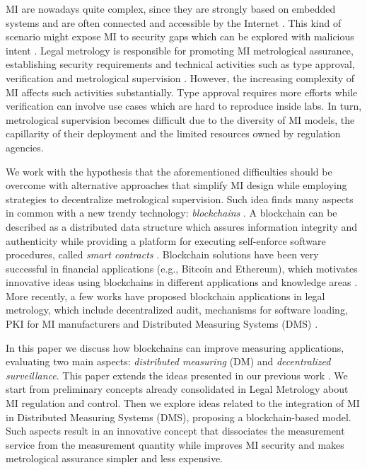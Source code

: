 \documentclass[journal]{IEEEtran}
\begin{document}
MI are nowadays quite complex, since they are strongly based on embedded systems and are often connected and accessible by the Internet \cite{Esche2015,Camara2012}. 
This kind of scenario might expose MI to security gaps which can be explored with malicious intent \cite{Boccardo2014,Peters2015}.
Legal metrology is responsible for promoting MI metrological assurance, establishing security requirements and technical activities such as type approval, verification and metrological supervision \cite{RodriguesFilho2015}. 
However, the increasing complexity of MI affects such activities substantially. 
Type approval requires more efforts while verification can involve use cases which are hard to reproduce inside labs. 
In turn, metrological supervision becomes difficult due to the diversity of MI models, the capillarity of their deployment and the limited resources owned by regulation agencies.

We work with the hypothesis that the aforementioned difficulties should be overcome with alternative approaches that simplify MI design while employing strategies to decentralize metrological supervision. 
Such idea finds many aspects in common with a new trendy technology: \emph{blockchains} \cite{Nakamoto2008}. 
A blockchain can be described as a distributed data structure which assures information integrity and authenticity while providing a platform for executing self-enforce software procedures, called \emph{smart contracts} \cite{Christidis2016}. Blockchain solutions have been very successful in financial applications (e.g., Bitcoin and Ethereum), which motivates innovative ideas using blockchains in different applications and knowledge areas \cite{Nakamoto2008,Christidis2016}.
More recently, a few works have proposed blockchain applications in legal metrology, which include decentralized audit, mechanisms for software loading, PKI for MI manufacturers and Distributed Measuring Systems (DMS) \cite{Peters2018,MeloJr.2018a}.

In this paper we discuss how blockchains can improve measuring applications, evaluating two main aspects: \emph{distributed measuring} (DM) and \emph{decentralized surveillance}.
This paper extends the ideas presented in our previous work \cite{MeloJr.2018a}.
We start from preliminary concepts already consolidated in Legal Metrology about MI regulation and control. 
Then we explore ideas related to the integration of MI in Distributed Measuring Systems (DMS), proposing a blockchain-based model.
Such aspects result in an innovative concept that dissociates the measurement service from the measurement quantity while improves MI security and makes metrological assurance simpler and less expensive. 
\end{document}

